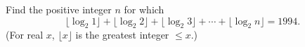 Find the positive integer $n$ for which \[ \lfloor \log_2{1}\rfloor+\lfloor\log_2{2}\rfloor+\lfloor\log_2{3}\rfloor+\cdots+\lfloor\log_2{n}\rfloor=1994.  \]  (For real $x$, $\lfloor x\rfloor$ is the greatest integer $\le x.$)